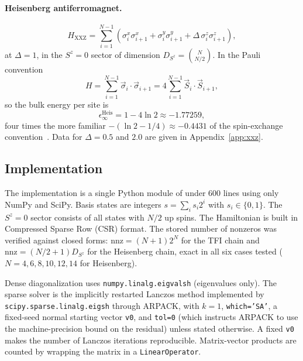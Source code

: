 \documentclass[pdflatex,sn-mathphys-num]{sn-jnl}
\begin{document}
\paragraph{Heisenberg antiferromagnet.}
\begin{equation}
H_{\mathrm{XXZ}} = \sum_{i=1}^{N-1}
  \left( \sigma^x_i \sigma^x_{i+1}
       + \sigma^y_i \sigma^y_{i+1}
       + \Delta\, \sigma^z_i \sigma^z_{i+1} \right),
\label{eq:xxz}
\end{equation}
at $\Delta = 1$, in the $S^z=0$ sector of dimension
$D_{S^z} = \binom{N}{N/2}$. In the Pauli convention
\begin{equation}
H = \sum_{i=1}^{N-1} \vec\sigma_i \cdot \vec\sigma_{i+1}
  = 4\sum_{i=1}^{N-1} \vec S_i \cdot \vec S_{i+1},
\label{eq:heis-convention}
\end{equation}
so the bulk energy per site is
\begin{equation}
\epsilon_\infty^{\mathrm{Heis}} = 1 - 4\ln 2 \approx -1.77259,
\label{eq:heis-limit}
\end{equation}
four times the more familiar $-(\ln 2 - 1/4) \approx -0.4431$ of the
spin-exchange convention~\cite{Hulthen1938}. Data for $\Delta = 0.5$
and $2.0$ are given in Appendix~\ref{app:xxz}.

\subsection{Implementation}
\label{sec:impl}

The implementation is a single Python module of under 600 lines using
only NumPy and SciPy. Basis states are integers
$s = \sum_i s_i 2^i$ with $s_i \in \{0,1\}$. The $S^z=0$ sector
consists of all states with $N/2$ up spins. The Hamiltonian is built
in Compressed Sparse Row (CSR) format. The stored number of nonzeros
was verified against closed forms:
$\mathrm{nnz} = (N+1)2^N$ for the TFI chain and
$\mathrm{nnz} = (N/2+1) D_{S^z}$ for the Heisenberg chain, exact in
all six cases tested ($N=4,6,8,10,12,14$ for Heisenberg).

Dense diagonalization uses \texttt{numpy.linalg.eigvalsh}
(eigenvalues only). The sparse solver is the implicitly restarted
Lanczos method implemented by \texttt{scipy.sparse.linalg.eigsh}
through ARPACK, with $k=1$, \texttt{which='SA'}, a fixed-seed normal
starting vector \texttt{v0}, and \texttt{tol=0} (which instructs
ARPACK to use the machine-precision bound on the residual) unless
stated otherwise. A fixed \texttt{v0} makes the number of Lanczos
iterations reproducible. Matrix-vector products are counted by
wrapping the matrix in a \texttt{LinearOperator}.
\end{document}
